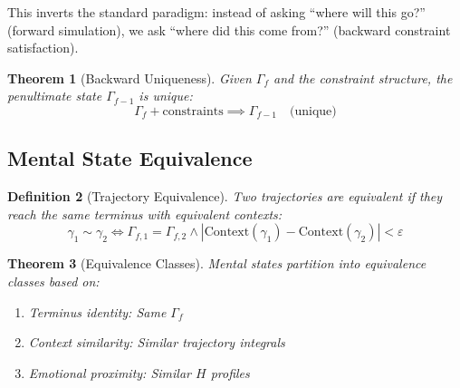 \documentclass[twocolumn,amsmath,amssymb,aps,prl,superscriptaddress]{revtex4-2}
\newtheorem{theorem}{Theorem}[section]
\newtheorem{definition}[theorem]{Definition}
\newcommand{\Hfield}{H}
\newcommand{\Gstate}{\Gamma}
\newcommand{\traj}{\gamma}
\begin{document}
This inverts the standard paradigm: instead of asking ``where will this go?'' (forward simulation), we ask ``where did this come from?'' (backward constraint satisfaction).

\begin{theorem}[Backward Uniqueness]
Given $\Gstate_f$ and the constraint structure, the penultimate state $\Gstate_{f-1}$ is unique:
\begin{equation}
\Gstate_f + \text{constraints} \implies \Gstate_{f-1} \quad \text{(unique)}
\end{equation}
\end{theorem}

\subsection{Mental State Equivalence}

\begin{definition}[Trajectory Equivalence]
Two trajectories are equivalent if they reach the same terminus with equivalent contexts:
\begin{equation}
\traj_1 \sim \traj_2 \iff \Gstate_{f,1} = \Gstate_{f,2} \land |\text{Context}(\traj_1) - \text{Context}(\traj_2)| < \varepsilon
\end{equation}
\end{definition}

\begin{theorem}[Equivalence Classes]
Mental states partition into equivalence classes based on:
\begin{enumerate}
\item Terminus identity: Same $\Gstate_f$
\item Context similarity: Similar trajectory integrals
\item Emotional proximity: Similar $\Hfield$ profiles
\end{enumerate}
\end{theorem}
\end{document}
